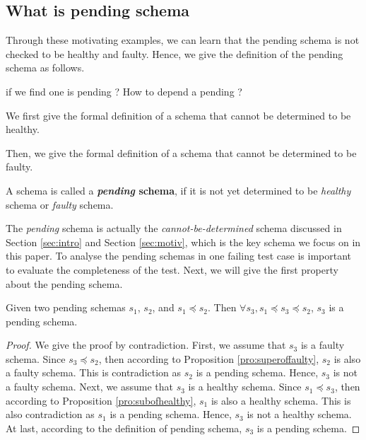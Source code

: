 \subsection{What is pending schema}

Through these motivating examples, we can learn that the pending schema is not checked to be healthy and faulty. Hence, we give the definition of the pending schema as follows.


if we find one is pending ? How to depend a pending ?

We first give the formal definition of a schema that cannot be determined to be healthy.
\begin{definition}\label{de:undeteminedhealthy}

\end{definition}

Then, we give the formal definition of  a schema that cannot be determined to be faulty.
\begin{definition}\label{de:undeteminedfaulty}

\end{definition}

\begin{definition}\label{de:pending}
A schema is called a \textbf{\emph{pending} schema}, if it is not yet determined to be \emph{healthy} schema or \emph{faulty} schema.
\end{definition}

The \emph{pending} schema is actually the \emph{cannot-be-determined} schema discussed in Section \ref{sec:intro} and Section \ref{sec:motiv}, which is the key schema we focus on in this paper. To analyse the pending schemas in one failing test case is important to evaluate the completeness of the test.  Next, we will give the first property about the pending schema.
%


\begin{proposition}\label{pro:pending}
Given two pending schemas $s_{1}$, $s_{2}$, and $s_{1} \preceq s_{2}$. Then $\forall s_{3}, s_{1} \preceq s_{3} \preceq s_{2}$, $s_{3}$ is a pending schema.
\end{proposition}

\begin{proof}
We give the proof by contradiction. First, we assume that $s_{3}$ is a faulty schema. Since $s_{3} \preceq s_{2}$, then according to Proposition \ref{pro:superoffaulty}, $s_{2}$ is also a faulty schema. This is contradiction as $s_{2}$ is a pending schema. Hence, $s_{3}$ is not a faulty schema. Next, we assume that $s_{3}$ is a healthy schema.  Since $s_{1} \preceq s_{3}$, then according to Proposition \ref{pro:subofhealthy}, $s_{1}$ is also a healthy schema. This is also contradiction as $s_{1}$ is a pending schema.  Hence, $s_{3}$ is not a healthy schema. At last, according to the definition of pending schema, $s_{3}$ is a pending schema.
\end{proof}

